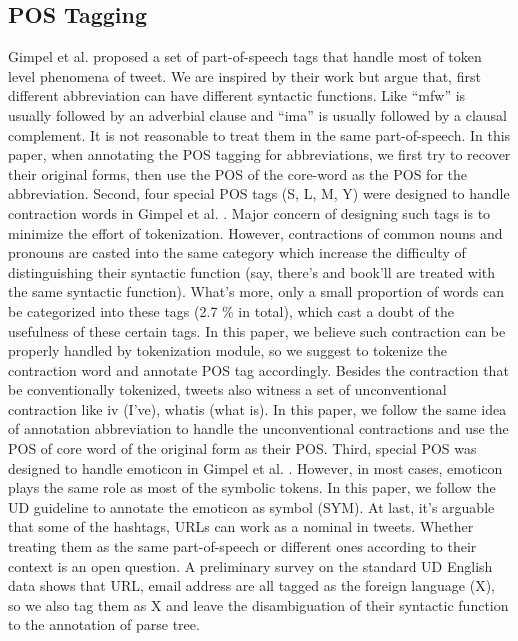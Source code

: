 \documentclass[11pt,letterpaper]{article}
\begin{document}
\subsection{POS Tagging}
Gimpel et al.  proposed a set of part-of-speech tags that handle most of token level phenomena of tweet. 
We are inspired by their work but argue that, first different abbreviation can have different syntactic functions. 
Like “mfw” is usually followed by an adverbial clause and “ima” is usually followed by a clausal complement. 
It is not reasonable to treat them in the same part-of-speech. 
In this paper, when annotating the POS tagging for abbreviations, we first try to recover their original forms, then use the POS of the core-word as the POS for the abbreviation.
Second, four special POS tags (S, L, M, Y) were designed to handle contraction words in Gimpel et al. . Major concern of designing such tags is to minimize the effort of tokenization. 
However, contractions of common nouns and pronouns are casted into the same category which increase the difficulty of distinguishing their syntactic function (say, there's and book'll are treated with the same syntactic function). What's more, only a small proportion of words can be categorized into these tags (2.7 \% in total), which cast a doubt of the usefulness of these certain tags. In this paper, we believe such contraction can be properly handled by tokenization module, so we suggest to tokenize the contraction word and annotate POS tag accordingly.
Besides the contraction that be conventionally tokenized, tweets also witness a set of unconventional contraction like iv (I've), whatis (what is). In this paper, we follow the same idea of annotation abbreviation to handle the unconventional contractions and use the POS of core word of the original form as their POS.
Third, special POS was designed to handle emoticon in Gimpel et al. . However, in most cases, emoticon plays the same role as most of the symbolic tokens. In this paper, we follow the UD guideline to annotate the emoticon as symbol (SYM).
At last, it’s arguable that some of the hashtags, URLs can work as a nominal in tweets. Whether treating them as the same part-of-speech or different ones according to their context is an open question. A preliminary survey on the standard UD English data shows that URL, email address are all tagged as the foreign language (X), so we also tag them as X and leave the disambiguation of their syntactic function to the annotation of parse tree.
\end{document}
